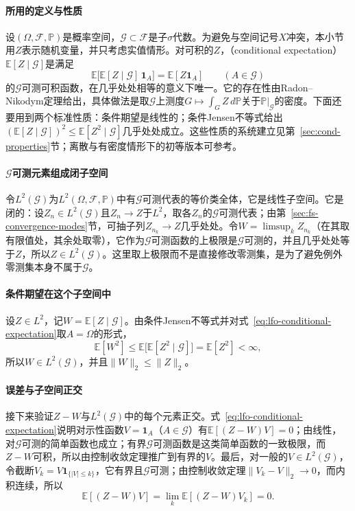 \paragraph{所用的定义与性质}
设$(\Omega,\mathcal F,\mathbb P)$是概率空间，$\mathcal G\subset\mathcal F$是子$\sigma$代数。为避免与空间记号$X$冲突，本小节用$Z$表示随机变量，并只考虑实值情形。对可积的$Z$，（conditional expectation）$\mathbb E[Z\mid\mathcal G]$是满足
\begin{equation}
 \mathbb E\bigl[\mathbb E[Z\mid\mathcal G]\,\mathbf 1_A\bigr]=\mathbb E[Z\mathbf 1_A]\qquad(A\in\mathcal G)
 \label{eq:lfo-conditional-expectation}
\end{equation}
的$\mathcal G$可测可积函数，在几乎处处相等的意义下唯一。它的存在性由Radon--Nikodym定理给出，具体做法是取$\mathcal G$上测度$G\mapsto\int_G Z\,d\mathbb P$关于$\mathbb P|_{\mathcal G}$的密度。下面还要用到两个标准性质：条件期望是线性的；条件Jensen不等式给出$(\mathbb E[Z\mid\mathcal G])^2\leq\mathbb E[Z^2\mid\mathcal G]$几乎处处成立。这些性质的系统建立见第~\ref{sec:cond-properties}节；离散与有密度情形下的初等版本可参考。

\paragraph{$\mathcal G$可测元素组成闭子空间}
令$L^2(\mathcal G)$为$L^2(\Omega,\mathcal F,\mathbb P)$中有$\mathcal G$可测代表的等价类全体，它是线性子空间。它是闭的：设$Z_n\in L^2(\mathcal G)$且$Z_n\to Z$于$L^2$，取各$Z_n$的$\mathcal G$可测代表；由第~\ref{sec:fs-convergence-modes}节，可抽子列$Z_{n_k}\to Z$几乎处处。令$W=\limsup_kZ_{n_k}$（在其取有限值处，其余处取零），它作为$\mathcal G$可测函数的上极限是$\mathcal G$可测的，并且几乎处处等于$Z$，所以$Z\in L^2(\mathcal G)$。这里取上极限而不是直接修改零测集，是为了避免例外零测集本身不属于$\mathcal G$。

\paragraph{条件期望在这个子空间中}
设$Z\in L^2$，记$W=\mathbb E[Z\mid\mathcal G]$。由条件Jensen不等式并对式~\eqref{eq:lfo-conditional-expectation}取$A=\Omega$的形式，
\[
 \mathbb E[W^2]\leq\mathbb E\bigl[\mathbb E[Z^2\mid\mathcal G]\bigr]=\mathbb E[Z^2]<\infty ,
\]
所以$W\in L^2(\mathcal G)$，并且$\|W\|_2\leq\|Z\|_2$。

\paragraph{误差与子空间正交}
接下来验证$Z-W$与$L^2(\mathcal G)$中的每个元素正交。式~\eqref{eq:lfo-conditional-expectation}说明对示性函数$V=\mathbf 1_A$（$A\in\mathcal G$）有$\mathbb E[(Z-W)V]=0$；由线性，对$\mathcal G$可测的简单函数也成立；有界$\mathcal G$可测函数是这类简单函数的一致极限，而$Z-W$可积，所以由控制收敛定理推广到有界的$V$。最后，对一般的$V\in L^2(\mathcal G)$，令截断$V_k=V\mathbf 1_{\{|V|\leq k\}}$，它有界且$\mathcal G$可测；由控制收敛定理$\|V_k-V\|_2\to0$，而内积连续，所以
\[
 \mathbb E[(Z-W)V]=\lim_k\mathbb E[(Z-W)V_k]=0 .
\]


